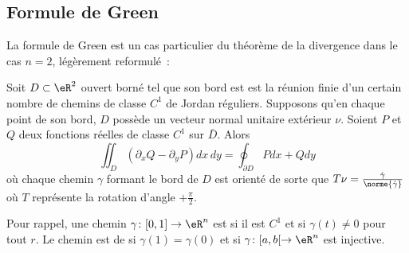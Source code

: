 \subsection{Formule de Green}
La formule de Green est un cas particulier du théorème de la divergence dans
le cas $n = 2$, légèrement reformulé~:
\begin{theorem}
	Soit $D \subset \eR^2$ ouvert borné tel que son bord est est la réunion finie d'un certain nombre de chemins de classe $C^1$ de Jordan réguliers.  Supposons qu'en chaque point de son bord, $D$ possède un vecteur normal unitaire extérieur $\nu$. Soient $P$ et $Q$ deux fonctions réelles de classe $C^1$ sur $\bar D$. Alors
  \begin{equation*}
    \iint_D (\partial_xQ - \partial_yP)dx\,dy = \oint_{\partial D}
    Pd x + Q d y
  \end{equation*}
  où chaque chemin $\gamma$ formant le bord de $D$ est orienté de
  sorte que $T \nu = \frac{\dot\gamma}{\norme{\dot\gamma}}$ où $T$
  représente la rotation d'angle $+\frac\pi2$.
\end{theorem}

Pour rappel, une chemin $\gamma\colon \mathopen[ 0 , 1 \mathclose]\to \eR^n$ est  si il est $C^1$ et si $\gamma(t)\neq 0$ pour tout $r$. Le chemin est de  si $\gamma(1)=\gamma(0)$ et si $\gamma\colon \mathopen[ a , b [\to \eR^n$ est injective.

